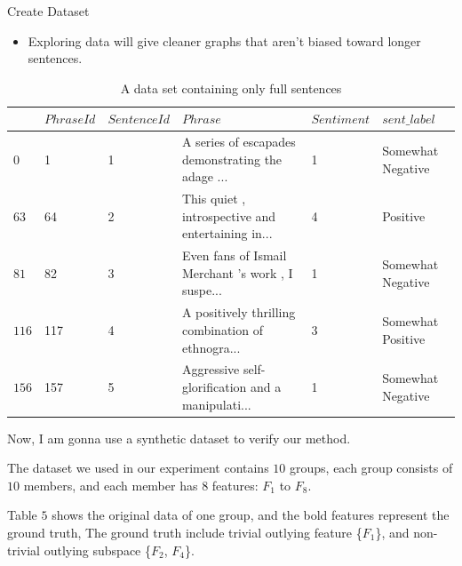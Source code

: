\documentclass[
 size=14pt,
 paper=smartboard,  %
 mode=present, 		%
 display=slides, 	%
 style=tuliplab,  	%
 pauseslide,
 fleqn,leqno]{powerdot}
\begin{document}
  \begin{slide}{Create Dataset }

    \begin{itemize}
    \item Exploring data will give cleaner graphs that aren't biased toward longer sentences.
    \end{itemize}
    
    \begin{table}
    \setlength{\abovecaptionskip}{0pt}
    \setlength{\belowcaptionskip}{10pt}
    \centering
    \caption{A data set containing only full sentences}
    
    \begin{tabular}{p{0.5cm}p{2.1cm}p{2.7cm}p{7cm}p{2.2cm}p{2.2cm}}
    \hline
        & $PhraseId$ & $SentenceId$ & $Phrase$ & $Sentiment$ &$sent\_label$ \\
    \hline
      $0$   & 1 & 1  & A series of escapades demonstrating the adage ...  & 1 &Somewhat Negative\\
      $63$   & 64  & 2  & This quiet , introspective and entertaining in...  & 4 &Positive\\
      $81$   & 82  & 3 & Even fans of Ismail Merchant 's work , I suspe...  & 1 &Somewhat Negative\\
      $116$   & 117  & 4  & A positively thrilling combination of ethnogra...  & 3 &Somewhat Positive\\
      $156$   & 157    & 5  & Aggressive self-glorification and a manipulati...  & 1&Somewhat Negative\\
  
      
      
    \hline
    \end{tabular}
    \end{table}
    
    \begin{note}
    Now,
    I am gonna use a synthetic dataset to verify our method.
    
    The dataset we used in our experiment contains $10$ groups,
    each group consists of $10$ members,
    and each member has $8$ features: $F_1$ to $F_8$.
    
    Table $5$ shows the original data of one group,
    and the bold features represent the ground truth,
    The ground truth include trivial outlying feature \{$F_1$\},
    and non-trivial outlying subspace \{$F_2$, $F_4$\}.
    \end{note}
    
    \end{slide}
\end{document}
